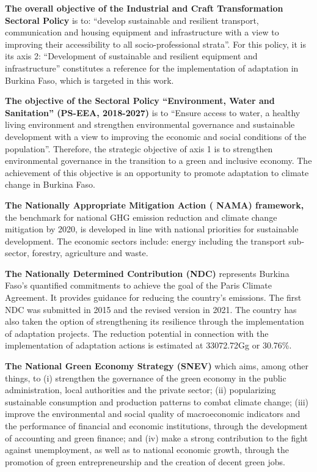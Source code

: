 \documentclass[
]{book}
\begin{document}
\textbf{The overall objective of the Industrial and Craft Transformation Sectoral Policy} is to: ``develop sustainable and resilient transport, communication and housing equipment and infrastructure with a view to improving their accessibility to all socio-professional strata''. For this policy, it is its axis 2: ``Development of sustainable and resilient equipment and infrastructure'' constitutes a reference for the implementation of adaptation in Burkina Faso, which is targeted in this work.

\textbf{The objective of the Sectoral Policy ``Environment, Water and Sanitation'' (PS-EEA, 2018-2027)} is to ``Ensure access to water, a healthy living environment and strengthen environmental governance and sustainable development with a view to improving the economic and social conditions of the population''. Therefore, the strategic objective of axis 1 is to strengthen environmental governance in the transition to a green and inclusive economy. The achievement of this objective is an opportunity to promote adaptation to climate change in Burkina Faso.

\textbf{The Nationally Appropriate Mitigation Action ( NAMA) framework,} the benchmark for national GHG emission reduction and climate change mitigation by 2020, is developed in line with national priorities for sustainable development. The economic sectors include: energy including the transport sub-sector, forestry, agriculture and waste.

\textbf{The Nationally Determined Contribution (NDC)} represents Burkina Faso's quantified commitments to achieve the goal of the Paris Climate Agreement. It provides guidance for reducing the country's emissions. The first NDC was submitted in 2015 and the revised version in 2021. The country has also taken the option of strengthening its resilience through the implementation of adaptation projects. The reduction potential in connection with the implementation of adaptation actions is estimated at 33072.72Gg or 30.76\%.

\textbf{The National Green Economy Strategy (SNEV)} which aims, among other things, to (i) strengthen the governance of the green economy in the public administration, local authorities and the private sector; (ii) popularizing sustainable consumption and production patterns to combat climate change; (iii) improve the environmental and social quality of macroeconomic indicators and the performance of financial and economic institutions, through the development of accounting and green finance; and (iv) make a strong contribution to the fight against unemployment, as well as to national economic growth, through the promotion of green entrepreneurship and the creation of decent green jobs.
\end{document}
